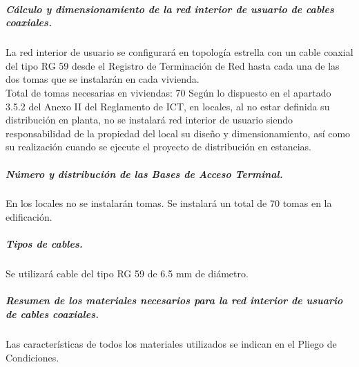 \subparagraph{Cálculo y dimensionamiento de la red interior de usuario de cables coaxiales.}
La red interior de usuario se configurará en topología estrella con un cable coaxial del tipo RG 59 desde el
Registro de Terminación de Red hasta cada una de las dos tomas que se instalarán en cada
vivienda.\\
Total de tomas necesarias en viviendas: 70
Según lo dispuesto en el apartado 3.5.2 del Anexo II del Reglamento de ICT, en locales, al no
estar definida su distribución en planta, no se instalará red interior de usuario siendo
responsabilidad de la propiedad del local su diseño y dimensionamiento, así como su realización
cuando se ejecute el proyecto de distribución en estancias.
\subparagraph{Número y distribución de las Bases de Acceso Terminal.}
En los locales no se instalarán tomas.
Se instalará un total de 70 tomas en la edificación.
\subparagraph{Tipos de cables.}
Se utilizará cable del tipo RG 59 de 6.5 mm de diámetro.
\subparagraph{Resumen de los materiales necesarios para la red interior de usuario de cables coaxiales.}
Las características de todos los materiales utilizados se indican en el Pliego de Condiciones.